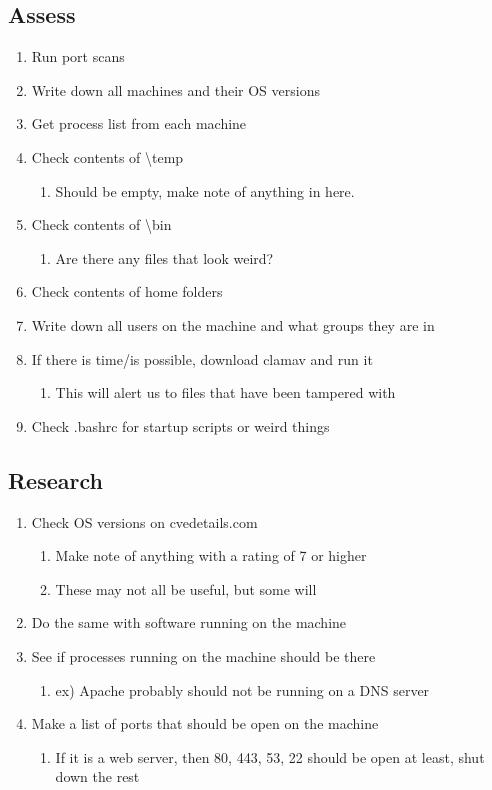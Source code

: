 \documentclass{article}
\begin{document}
\subsection{Assess}
\begin{enumerate}
	\item Run port scans
	\item Write down all machines and their OS versions
	\item Get process list from each machine
	\item Check contents of \textbackslash temp
	\begin{enumerate}
		\item Should be empty, make note of anything in here.
	\end{enumerate}
	\item Check contents of \textbackslash bin
	\begin{enumerate}
		\item Are there any files that look weird?
	\end{enumerate}
	\item Check contents of home folders
	\item Write down all users on the machine and what groups they are in
	\item If there is time/is possible, download clamav and run it
	\begin{enumerate}
		\item This will alert us to files that have been tampered with
	\end{enumerate}
	\item Check .bashrc for startup scripts or weird things
\end{enumerate}

\subsection{Research}
\begin{enumerate}
	\item Check OS versions on cvedetails.com
	\begin{enumerate}
		\item Make note of anything with a rating of 7 or higher
		\item These may not all be useful, but some will
	\end{enumerate}
	\item Do the same with software running on the machine
	\item See if processes running on the machine should be there
	\begin{enumerate}
		\item ex) Apache probably should not be running on a DNS server
	\end{enumerate}
	\item Make a list of ports that should be open on the machine
	\begin{enumerate}
		\item If it is a web server, then 80, 443, 53, 22 should be open at least, shut down the rest
	\end{enumerate}
\end{enumerate}
\end{document}

